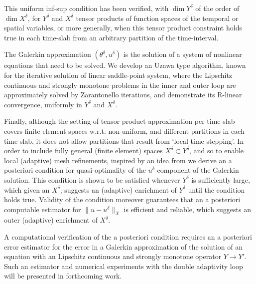 \documentclass{amsart}
\numberwithin{equation}{section}
\newcommand{\1}{\mathbb 1}
\begin{document}
This uniform inf-sup condition has been verified, with $\dim Y^\delta$ of the order of $\dim X^\delta$, for $Y^\delta$ and $X^\delta$ tensor products of function spaces of the temporal or spatial variables, or more generally, when this tensor product constraint holds true in each time-slab from an arbitrary partition of the time-interval.

The Galerkin approximation $(\theta^\delta,u^\delta)$ is the solution of a system of nonlinear equations that need to be solved.
We develop an Uzawa type algorithm, known for the iterative solution of linear saddle-point system, where 
the Lipschitz continuous and strongly monotone problems in the inner and outer loop are approximately solved by Zarantonello iterations, and demonstrate its R-linear convergence, uniformly in $Y^\delta$ and $X^\delta$.

Finally, although the setting of tensor product approximation per time-slab covers finite element spaces w.r.t. non-uniform, and different partitions in each time slab, it does not allow partitions that result from `local time stepping'.
In order to include fully general (finite element) spaces $X^\delta \subset Y^\delta$, and so to enable local (adaptive) mesh refinements,
inspired by an idea from \cite{45.44} we derive an a posteriori condition for quasi-optimality of the $u^\delta$ component of the Galerkin solution. This condition is shown to be satisfied whenever $Y^\delta$ is sufficiently large, which given an $X^\delta$, suggests an (adaptive) enrichment of $Y^\delta$ until the condition holds true. Validity of the condition moreover guarantees that an a posteriori computable estimator for $\|u-u^\delta\|_X$ is efficient and reliable, which suggests an outer (adaptive) enrichment of $X^\delta$.

A computational verification of the a posteriori condition requires an a posteriori error estimator for the error in a Galerkin approximation of the solution of an equation with an
Lipschitz continuous and strongly monotone operator $Y \rightarrow Y'$. 
Such an estimator and numerical experiments with the double adaptivity loop will be presented in forthcoming work.
\end{document}
